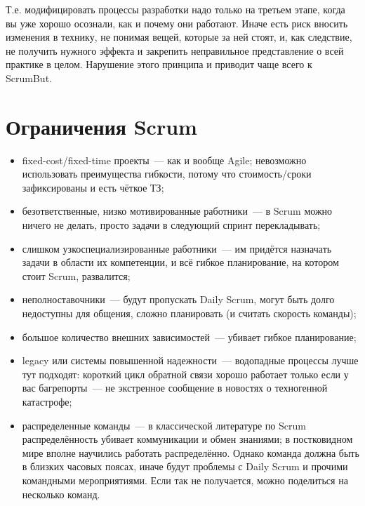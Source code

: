 \documentclass{../../text-style}
\begin{document}
Т.е. модифицировать процессы разработки надо только на третьем этапе, когда вы уже хорошо осознали, как и почему они работают. Иначе есть риск вносить изменения в технику, не понимая вещей, которые за ней стоят, и, как следствие, не получить нужного эффекта и закрепить неправильное представление о всей практике в целом. Нарушение этого принципа и приводит чаще всего к ScrumBut. 

\section{Ограничения Scrum}

\begin{itemize}
    \item fixed-cost/fixed-time проекты~--- как и вообще Agile; невозможно использовать преимущества гибкости, потому что стоимость/сроки зафиксированы и есть чёткое ТЗ;
    \item безответственные, низко мотивированные работники~--- в Scrum можно ничего не делать, просто задачи в следующий спринт перекладывать;
    \item слишком узкоспециализированные работники~--- им придётся назначать задачи в области их компетенции, и всё гибкое планирование, на котором стоит Scrum, развалится;
    \item неполноставочники~--- будут пропускать Daily Scrum, могут быть долго недоступны для общения, сложно планировать (и считать скорость команды);
    \item большое количество внешних зависимостей~--- убивает гибкое планирование;
    \item legacy или системы повышенной надежности~--- водопадные процессы лучше тут подходят: короткий цикл обратной связи хорошо работает только если у вас багрепорты~--- не экстренное сообщение в новостях о техногенной катастрофе;
    \item распределенные команды~--- в классической литературе по Scrum распределённость убивает коммуникации и обмен знаниями; в постковидном мире вполне научились работать распределённо. Однако команда должна быть в близких часовых поясах, иначе будут проблемы с Daily Scrum и прочими командными мероприятиями. Если так не получается, можно поделиться на несколько команд.
\end{itemize}
\end{document}

